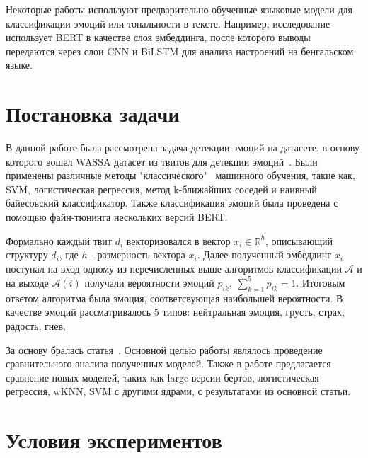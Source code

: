 \documentclass{article}
\begin{document}
 Некоторые работы используют предварительно обученные языковые модели для классификации эмоций или тональности в тексте. Например, исследование~\cite{prottasha} использует BERT в качестве слоя эмбеддинга, после которого выводы передаются через слои CNN и BiLSTM для анализа настроений на бенгальском языке.

 \section{Постановка задачи}
 В  данной работе была рассмотрена задача детекции эмоций на датасете, в основу которого вошел WASSA датасет из твитов для детекции эмоций~\cite{wassa}. Были применены различные методы "классического" \ машинного обучения, такие как, SVM, логистическая регрессия, метод k-ближайших
 соседей и наивный байесовский классификатор. Также классификация эмоций была проведена с помощью файн-тюнинга нескольких версий BERT. 

 Формально каждый твит $d_i$ векторизовался в вектор $x_i \in \mathbb{R}^h$, описывающий структуру $d_i$, где $h$ - размерность вектора $x_i$. Далее полученный эмбеддинг
 $x_i$ поступал на вход одному из перечисленных выше алгоритмов классификации $\mathcal{A}$ и на выходе $\mathcal{A}(i)$ получали вероятности эмоций $p_{ik},\ \sum_{k=1}^5p_{ik} = 1$. Итоговым ответом алгоритма была эмоция, соответсвующая наибольшей вероятности. В качестве эмоций рассматривалось  5 типов: нейтральная эмоция, грусть, страх, радость, гнев.

 За основу бралась статья~\cite{albu}. Основной целью работы являлось проведение сравнительного анализа полученных моделей. Также в работе предлагается сравнение новых моделей, таких как large-версии бертов, логистическая регрессия, wKNN, SVM с другими ядрами, с результатами из основной статьи.

\section{Условия экспериментов}
\end{document}
